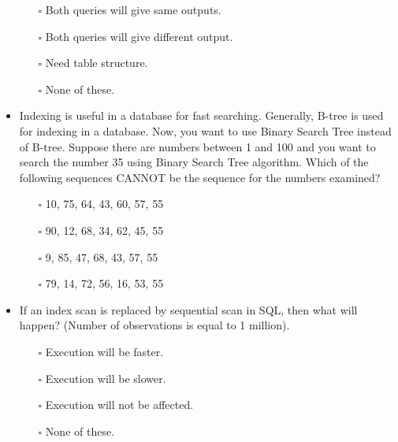 \documentclass[10pt]{article}
\begin{document}
\begin{itemize}
				\begin{enumerate}
					\item[$\square$] Both queries will give same outputs.
					\item[$\square$] Both queries will give different output.
					\item[$\square$] Need table structure.
					\item[$\square$] None of these.
				\end{enumerate}

			\item Indexing is useful in a database for fast searching. Generally, B-tree is used for indexing in a database. Now, you want to use Binary Search Tree instead of B-tree. Suppose there are numbers between 1 and 100 and you want to search the number 35 using Binary Search Tree algorithm. Which of the following sequences CANNOT be the sequence for the numbers examined?
				\begin{enumerate}
					\item[$\square$] 10, 75, 64, 43, 60, 57, 55
					\item[$\square$] 90, 12, 68, 34, 62, 45, 55
					\item[$\square$] 9, 85, 47, 68, 43, 57, 55
					\item[$\square$] 79, 14, 72, 56, 16, 53, 55
				\end{enumerate}
			
			\item If an index scan is replaced by sequential scan in SQL, then what will happen? (Number of observations is equal to 1 million).
				\begin{enumerate}
					\item[$\square$] Execution will be faster.
					\item[$\square$] Execution will be slower.
					\item[$\square$] Execution will not be affected.
					\item[$\square$] None of these.
				\end{enumerate}


\end{itemize}
\end{document}
